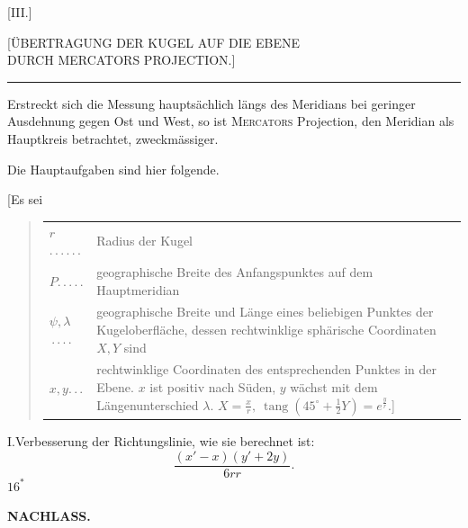 \par\clearpage

\thispagestyle{empty}
\vspace*{4\baselineskip}
\begin{center}
{\large [III.]}\par\bigskip
{\Large [ÜBERTRAGUNG DER KUGEL AUF DIE EBENE\\
DURCH MERCATORS PROJECTION.]}\par\bigskip
\rule{.09\linewidth}{.4pt}\par\bigskip
[1.]
\end{center}
Erstreckt sich die Messung hauptsächlich längs des Meridians bei geringer
Ausdehnung gegen Ost und West, so ist \textsc{Mercators} Projection, den Meridian
als Hauptkreis betrachtet, zweckmässiger.

Die Hauptaufgaben sind hier folgende.

[Es sei
\begin{quote}
\setlength{\tabcolsep}{0pt}
\begin{tabular}{@{}lp{.82\linewidth}@{}}
\(r\)\enspace.\,.\,.\,.\,.\,. & Radius der Kugel\\
\(P\)\enspace.\,.\,.\,.\,. & geographische Breite des Anfangspunktes auf dem Hauptmeridian\\
\(\psi,\lambda\)\,.\,.\,.\,. & geographische Breite und Länge eines beliebigen Punktes der
Kugeloberfläche, dessen rechtwinklige sphärische Coordinaten \(X,Y\) sind\\
\(x,y\)\enspace.\,.\,. & rechtwinklige Coordinaten des entsprechenden Punktes in der Ebene.
\(x\) ist positiv nach Süden, \(y\) wächst mit dem Längenunterschied \(\lambda\).
\quad \(X=\frac xr,\ \operatorname{tang}(45^\circ+\tfrac12Y)=e^{\frac yr}\).]
\end{tabular}
\end{quote}
I.\quad Verbesserung der Richtungslinie, wie sie berechnet ist:
\[
\frac{(x'-x)(y'+2y)}{6rr}.
\]
\noindent\hfill \(16^{*}\)\hspace*{.14\linewidth}\par

\par\clearpage
\noindent{}\hfill{\small\textbf{NACHLASS.}}\hfill\null\par\medskip

